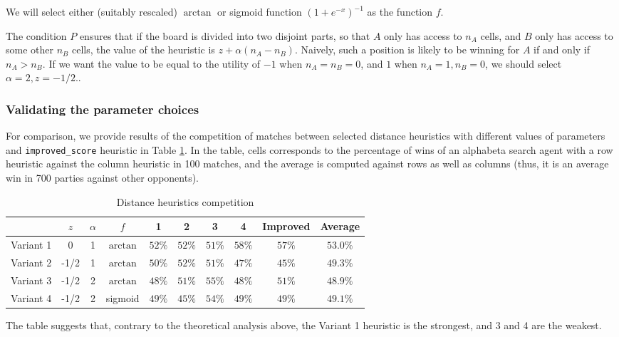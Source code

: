 \documentclass[oneside]{article}   	%
\begin{document}
We will select either (suitably rescaled) $\arctan$ or sigmoid function $(1+e^{-x})^{-1}$ as the function $f$.

The condition $P$ ensures that if the board is divided into two disjoint parts, so that $A$ only has access to $n_A$ cells, and $B$ only has access to some other $n_B$ cells, the value of the heuristic is $z+\alpha(n_A-n_B)$. Naively, such a position is likely to be winning for $A$ if and only if $n_A > n_B$. If we want the value to be equal to the utility of $-1$ when $n_A=n_B=0$, and $1$ when $n_A=1, n_B=0$, we should select $\alpha = 2, z = -1/2$..

\subsubsection{Validating the parameter choices}
\label{distancechoices}

For comparison, we provide results of the competition of matches between selected distance heuristics with different values of parameters and \texttt{improved\_score} heuristic in Table \ref{DistanceCompetition}. In the table, cells corresponds to the percentage of wins of an alphabeta search agent with a row heuristic against the column heuristic in 100 matches, and the average is computed against rows as well as columns (thus, it is an average win in 700 parties against other opponents).

\begin{table}[htp]
\caption{Distance heuristics competition}
\begin{center}
\begin{tabular}{c|ccc|ccccc|c}
   & $z$ & $\alpha$ & $f$ & 1 & 2 & 3 & 4 & Improved & Average \\
   \hline
 Variant 1 &    0 & 1 & $\arctan$  & $52\%$ & $52\%$ & $51\%$ & $58\%$ & $57\%$ & $53.0\%$ \\
 Variant 2 & -1/2 & 1 & $\arctan$  & $50\%$ & $52\%$ & $51\%$ & $47\%$ & $45\%$ & $49.3\%$ \\
 Variant 3 & -1/2 & 2 & $\arctan$  & $48\%$ & $51\%$ & $55\%$ & $48\%$ & $51\%$ & $48.9\%$ \\
 Variant 4 & -1/2 & 2 & sigmoid    & $49\%$ & $45\%$ & $54\%$ & $49\%$ & $49\%$ & $49.1\%$
 
\end{tabular}
\end{center}
\label{DistanceCompetition}
\end{table}%

The table suggests that, contrary to the theoretical analysis above, the Variant 1 heuristic is the strongest, and 3 and 4 are the weakest.
\end{document}

